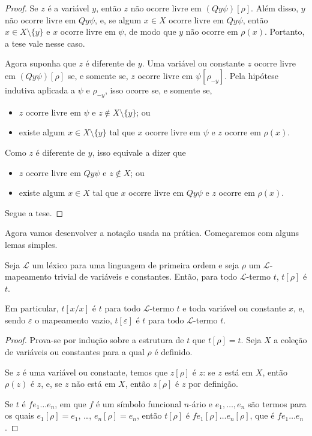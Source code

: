 \begin{proof}
    Se $z$ é a variável $y$, então $z$ não ocorre livre em $(Qy\psi)[\rho]$.
    Além disso, $y$ não ocorre livre em $Qy\psi$, e, se algum $x\in X$ ocorre livre em $Qy\psi$, então $x\in X\setminus\{y\}$ e $x$ ocorre livre em $\psi$, de modo que $y$ não ocorre em $\rho(x)$.
    Portanto, a tese vale nesse caso.

    Agora suponha que $z$ é diferente de $y$.
    Uma variável ou constante $z$ ocorre livre em $(Qy\psi)[\rho]$ se, e somente se, $z$ ocorre livre em $\psi[\rho_{-y}]$.
    Pela hipótese indutiva aplicada a $\psi$ e $\rho_{-y}$, isso ocorre se, e somente se,
    \begin{itemize}
        \item $z$ ocorre livre em $\psi$ e $z\notin X\setminus\{y\}$; ou
        \item existe algum $x\in X\setminus\{y\}$ tal que $x$ ocorre livre em $\psi$ e $z$ ocorre em $\rho(x)$.
    \end{itemize}
    Como $z$ é diferente de $y$, isso equivale a dizer que
    \begin{itemize}
        \item $z$ ocorre livre em $Qy\psi$ e $z\notin X$; ou
        \item existe algum $x\in X$ tal que $x$ ocorre livre em $Qy\psi$ e $z$ ocorre em $\rho(x)$.
    \end{itemize}
    Segue a tese.
\end{proof}

Agora vamos desenvolver a notação usada na prática.
Começaremos com alguns lemas simples.
\begin{metalemma}\label{mlem:substituicaoTrivialTermos}
    Seja $\mathcal L$ um léxico para uma linguagem de primeira ordem e seja $\rho$ um $\mathcal L$-mapeamento trivial de variáveis e constantes.
    Então, para todo $\mathcal L$-termo $t$, $t[\rho]$ é $t$.

    Em particular, $t[x/x]$ é $t$ para todo $\mathcal L$-termo $t$ e toda variável ou constante $x$, e, sendo $\varepsilon$ o mapeamento vazio, $t[\varepsilon]$ é $t$ para todo $\mathcal L$-termo $t$.
\end{metalemma}
\begin{proof}
    Prova-se por indução sobre a estrutura de $t$ que $t[\rho]=t$.
    Seja $X$ a coleção de variáveis ou constantes para a qual $\rho$ é definido.

    Se $z$ é uma variável ou constante, temos que $z[\rho]$ é $z$: se $z$ está em $X$, então $\rho(z)$ é $z$, e, se $z$ não está em $X$, então $z[\rho]$ é $z$ por definição.

    Se $t$ é $fe_1 \dots e_n$, em que $f$ é um símbolo funcional $n$-ário e $e_1, \dots, e_n$ são termos para os quais $e_1[\rho]=e_1$, \dots, $e_n[\rho]=e_n$, então $t[\rho]$ é $fe_1[\rho] \dots e_n[\rho]$, que é $fe_1 \dots e_n$.
\end{proof}

